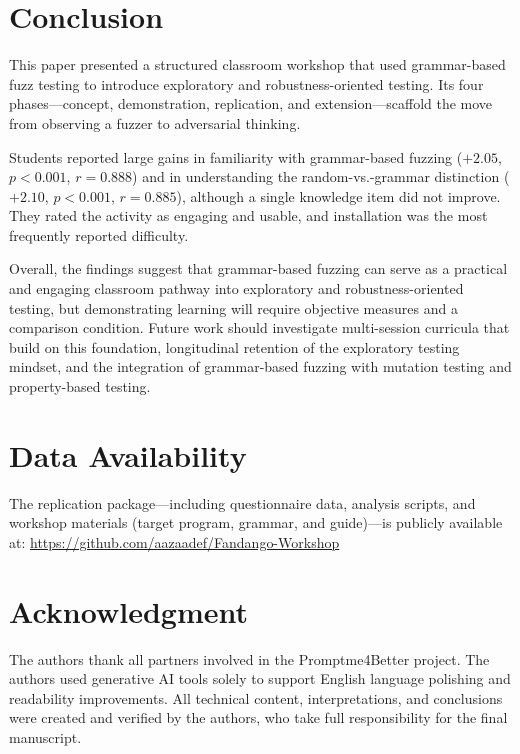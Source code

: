\documentclass[conference]{IEEEtran}
\begin{document}
\section{Conclusion}
\label{sec:conclusion}

This paper presented a structured classroom workshop that used grammar-based fuzz testing to introduce exploratory and robustness-oriented testing.
Its four phases---concept, demonstration, replication, and extension---scaffold the move from observing a fuzzer to adversarial thinking.

Students reported large gains in familiarity with grammar-based fuzzing ($+2.05$, $p < 0.001$, $r = 0.888$) and in understanding the random-vs.-grammar distinction ($+2.10$, $p < 0.001$, $r = 0.885$), although a single knowledge item did not improve.
They rated the activity as engaging and usable, and installation was the most frequently reported difficulty.

Overall, the findings suggest that grammar-based fuzzing can serve as a practical and engaging classroom pathway into exploratory and robustness-oriented testing, but demonstrating learning will require objective measures and a comparison condition.
Future work should investigate multi-session curricula that build on this foundation, longitudinal retention of the exploratory testing mindset, and the integration of grammar-based fuzzing with mutation testing and property-based testing.

\section*{Data Availability}
The replication package---including questionnaire data, analysis scripts, and workshop materials (target program, grammar, and guide)---is publicly available at: \url{https://github.com/aazaadef/Fandango-Workshop}

\section*{Acknowledgment}
The authors thank all partners involved in the Promptme4Better project.
The authors used generative AI tools solely to support English language polishing and readability improvements.
All technical content, interpretations, and conclusions were created and verified by the authors, who take full responsibility for the final manuscript.
\end{document}
